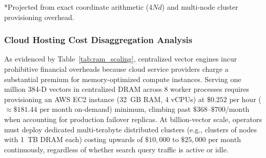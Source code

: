 \documentclass[11pt,journal,compsoc,onecolumn]{IEEEtran}
\begin{document}
\begin{table}[H]
\centering
\caption{Empirical Server Index Memory (RAM) Scaling vs. Disaggregated Zero-Memory Origin ($d=384$)}
\label{tab:ram_scaling}
\vspace{2pt}
\par\vspace{6pt}\noindent
\footnotesize{*Projected from exact coordinate arithmetic ($4Nd$) and multi-node cluster provisioning overhead.}
\end{table}

\subsubsection{Cloud Hosting Cost Disaggregation Analysis}
As evidenced by Table~\ref{tab:ram_scaling}, centralized vector engines incur prohibitive financial overheads because cloud service providers charge a substantial premium for memory-optimized compute instances. Serving one million 384-D vectors in centralized DRAM across 8 worker processes requires provisioning an AWS EC2  instance (32~GB RAM, 4 vCPUs) at $\$0.252\text{ per hour}$ ($\approx \$181.44\text{ per month}$ on-demand) minimum, climbing past $\$368\text{--}\$700\text{/month}$ when accounting for production failover replicas. At billion-vector scale, operators must deploy dedicated multi-terabyte distributed clusters (e.g., clusters of  nodes with 1~TB DRAM each) costing upwards of $\$10,000\text{ to }\$25,000\text{ per month}$ continuously, regardless of whether search query traffic is active or idle.
\end{document}
